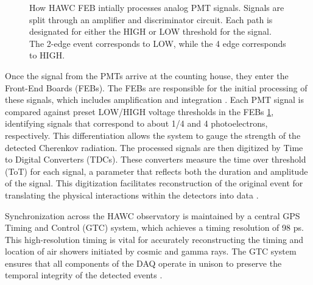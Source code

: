 \begin{figure}
    \caption{How HAWC FEB intially processes analog PMT signals. Signals are split through an amplifier and discriminator circuit. Each path is designated for either the HIGH or LOW threshold for the signal. The 2-edge event corresponds to LOW, while the 4 edge corresponds to HIGH.}
    \label{fig:tot_threholds}
\end{figure}

Once the signal from the PMTs arrive at the counting house, they enter the Front-End Boards (FEBs).
The FEBs are responsible for the initial processing of these signals, which includes amplification and integration \cite{Milagro_DAQ}.
Each PMT signal is compared against preset LOW/HIGH voltage thresholds in the FEBs \cref{fig:tot_threholds}, identifying signals that correspond to about 1/4 and 4 photoelectrons, respectively.
This differentiation allows the system to gauge the strength of the detected Cherenkov radiation.
The processed signals are then digitized by Time to Digital Converters (TDCs).
These converters measure the time over threshold (ToT) for each signal, a parameter that reflects both the duration and amplitude of the signal.
This digitization facilitates reconstruction of the original event for translating the physical interactions within the detectors into data \cite{nim:hawc_detect,HAWC_DAQ_NIM,Milagro_DAQ}.

Synchronization across the HAWC observatory is maintained by a central GPS Timing and Control (GTC) system, which achieves a timing resolution of 98 ps.
This high-resolution timing is vital for accurately reconstructing the timing and location of air showers initiated by cosmic and gamma rays.
The GTC system ensures that all components of the DAQ operate in unison to preserve the temporal integrity of the detected events \cite{nim:hawc_detect,hawc_daq_thesis}.

